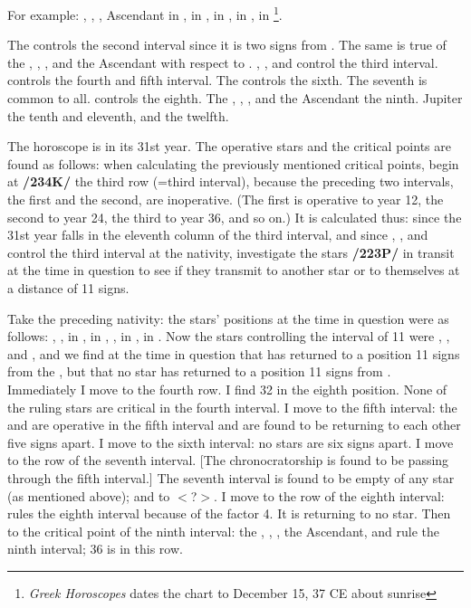 \noindent For example: \Sun, \Mars, \Mercury, Ascendant in \Sagittarius, \Moon\xspace in \Leo, \Saturn\xspace in \Virgo, \Jupiter\xspace in \Scorpio, \Venus\xspace in \Capricorn\footnote{\textit{Greek Horoscopes} dates the chart to December 15, 37 CE about sunrise}. 

The \Moon\xspace controls the second interval since it is two signs from \Saturn. The same is true of the \Sun, \Mars, \Mercury, and the Ascendant with respect to \Venus. \Saturn, \Jupiter, and \Venus\xspace control the third interval. \Saturn\xspace controls the fourth and fifth interval. The \Moon\xspace controls the sixth. The seventh is common to all. \Venus\xspace controls the eighth. The \Sun, \Mars, \Mercury, and the Ascendant the ninth. Jupiter the tenth and eleventh, and \Venus\xspace the twelfth. 

The horoscope is in its 31st year. The operative stars and the critical points are found as follows: when calculating the previously mentioned critical points, begin at \textbf{/234K/} the third row (=third interval), because the preceding two intervals, the first and the second, are inoperative. (The first is operative to year 12, the second to year 24,
the third to year 36, and so on.) It is calculated thus: since the 31st year falls in the eleventh column of the third interval, and since \Saturn, \Jupiter, and \Venus\xspace control the third interval at the nativity, investigate the stars \textbf{/223P/} in transit at the time in question to see if they transmit to another star or to themselves at a
distance of 11 signs. 

Take the preceding nativity: the stars’ positions at the time in question were as follows: \Sun, \Jupiter, \Mercury\xspace in \Gemini, \Saturn\xspace in \Virgo, \Mars, \Venus\xspace in \Taurus, \Moon\xspace in \Pisces. Now the stars controlling the interval of 11 were \Saturn, \Jupiter, and \Venus, and we find at the time in question
that \Venus\xspace has returned to a position 11 signs from the \Moon, but that no star has returned to a position 11 signs from \Jupiter. Immediately I move to the fourth row. I find 32 in the eighth position. None of the ruling stars are critical in the fourth interval. I move to the fifth interval: the \Moon\xspace and \Saturn\xspace are operative
in the fifth interval and are found to be returning to each other five signs apart. I move to the sixth interval: no stars are six signs apart. I move to the row of the seventh interval. [The chronocratorship is found to be passing through the fifth interval.] The seventh interval is found to be empty of any star (as mentioned above); \Mars\xspace and \Venus\xspace to \Saturn\xspace $<$?$>$. I move to the row of the eighth interval: \Venus\xspace rules the eighth interval because of the factor 4. It is returning to no star. Then to the critical point of the ninth interval: the \Sun, \Mars, \Mercury, the Ascendant, and \Venus\xspace rule the ninth interval; 36 is in this row. 

